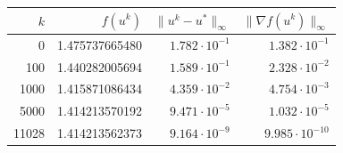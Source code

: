 \documentclass[12pt,letterpaper]{article}
\begin{document}
\begin{center}
\small
\begin{tabular}{r r r r}
$k$ & $f(u^k)$ & $\|u^k-u^*\|_\infty$ & $\|\nabla f(u^k)\|_\infty$\\
\hline
0 & 1.475737665480 & $1.782\cdot10^{-1}$ & $1.382\cdot10^{-1}$ \\
100 & 1.440282005694 & $1.589\cdot10^{-1}$ & $2.328\cdot10^{-2}$ \\
1000 & 1.415871086434 & $4.359\cdot10^{-2}$ & $4.754\cdot10^{-3}$ \\
5000 & 1.414213570192 & $9.471\cdot10^{-5}$ & $1.032\cdot10^{-5}$ \\
11028 & 1.414213562373 & $9.164\cdot10^{-9}$ & $9.985\cdot10^{-10}$ \\
\end{tabular}
\end{center}
\end{document}
